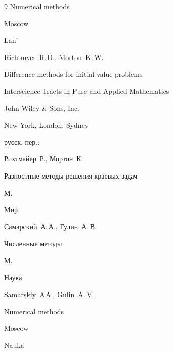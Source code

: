 \begin{thebibliography}{9}
\book Numerical methods

\publaddr Moscow

\publ Lan'








\by Richtmyer~R.\,D., Morton~K.\,W.

\book Difference methods for initial-value problems

\serial Interscience Tracts in Pure and Applied Mathematics


\publ John Wiley \& Sons, Inc.

\publaddr New York, London, Sydney




\rtransl русск. пер.:~

\by Рихтмайер~Р., Мортон~К.

\book Разностные методы решения краевых задач

\publaddr М.

\publ Мир






\by Самарский~А.\,А., Гулин~А.\,В.

\book Численные методы

\publaddr М.

\publ Наука



\misctransl

\by Samarskiy~A\,A., Gulin~A.\,V.

\book Numerical methods

\publaddr Moscow

\publ Nauka









\end{thebibliography}





